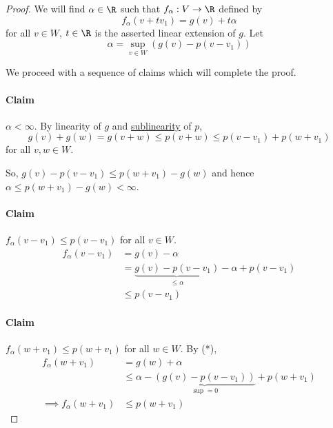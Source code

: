 \documentclass{article}
\begin{document}
\begin{proof}
    We will find $\alpha \in \R$ such that $f_\alpha: V \to \R$ defined by
    \begin{equation*}
        f_\alpha(v + tv_1) = g(v) + t\alpha
    \end{equation*}
    for all $v \in W$, $t \in \R$ is the asserted linear extension of $g$. Let
    \begin{equation*}
        \alpha = \sup_{v \in W} (g(v) - p(v - v_1))
    \end{equation*}

    We proceed with a sequence of claims which will complete the proof.

    \paragraph{Claim} $\alpha < \infty$.
    By linearity of $g$ and \hyperlink{def:sublinear}{sublinearity} of $p$,
    \begin{equation*}
        g(v) + g(w) = g(v + w) \leq p(v + w) \leq p(v - v_1) + p(w + v_1)
    \end{equation*}
    for all $v, w \in W$. %

    So, $g(v) - p(v - v_1) \leq p(w + v_1) - g(w)$ and hence $\alpha \leq p(w + v_1) - g(w) < \infty$.

    \paragraph{Claim} $f_\alpha(v - v_1) \leq p(v - v_1)$ for all $v \in W$.
    \begin{align*}
        f_\alpha(v - v_1) &= g(v) - \alpha \\
                          &= \underbrace{g(v) - p(v - v_1)}_{\leq \alpha} - \alpha + p(v - v_1) \\
                          &\leq p(v - v_1)
    \end{align*}

    \paragraph{Claim} $f_\alpha(w + v_1) \leq p(w + v_1)$ for all $w \in W$.
    By (*),
    \begin{align*}
        f_\alpha(w + v_1) &= g(w) + \alpha \\
                          &\leq \alpha - \underbrace{(g(v) - p(v-v_1))}_{\sup = 0} + p(w + v_1) \\
        \implies f_\alpha(w + v_1) &\leq p(w + v_1)
    \end{align*}


\end{proof}
\end{document}
